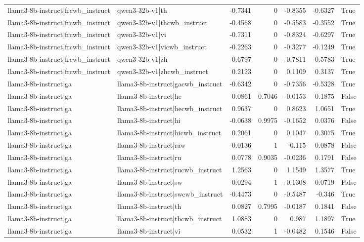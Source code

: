 \begin{table}
\begin{tabular}{l l r r r r l}
llama3-8b-instruct|frcwb_instruct & qwen3-32b-v1|th & -0.7341 & 0 & -0.8355 & -0.6327 & True \\
llama3-8b-instruct|frcwb_instruct & qwen3-32b-v1|thcwb_instruct & -0.4568 & 0 & -0.5583 & -0.3552 & True \\
llama3-8b-instruct|frcwb_instruct & qwen3-32b-v1|vi & -0.7311 & 0 & -0.8324 & -0.6297 & True \\
llama3-8b-instruct|frcwb_instruct & qwen3-32b-v1|vicwb_instruct & -0.2263 & 0 & -0.3277 & -0.1249 & True \\
llama3-8b-instruct|frcwb_instruct & qwen3-32b-v1|zh & -0.6797 & 0 & -0.7811 & -0.5783 & True \\
llama3-8b-instruct|frcwb_instruct & qwen3-32b-v1|zhcwb_instruct & 0.2123 & 0 & 0.1109 & 0.3137 & True \\
llama3-8b-instruct|ga & llama3-8b-instruct|gacwb_instruct & -0.6342 & 0 & -0.7356 & -0.5328 & True \\
llama3-8b-instruct|ga & llama3-8b-instruct|he & 0.0861 & 0.7046 & -0.0153 & 0.1875 & False \\
llama3-8b-instruct|ga & llama3-8b-instruct|hecwb_instruct & 0.9637 & 0 & 0.8623 & 1.0651 & True \\
llama3-8b-instruct|ga & llama3-8b-instruct|hi & -0.0638 & 0.9975 & -0.1652 & 0.0376 & False \\
llama3-8b-instruct|ga & llama3-8b-instruct|hicwb_instruct & 0.2061 & 0 & 0.1047 & 0.3075 & True \\
llama3-8b-instruct|ga & llama3-8b-instruct|raw & -0.0136 & 1 & -0.115 & 0.0878 & False \\
llama3-8b-instruct|ga & llama3-8b-instruct|ru & 0.0778 & 0.9035 & -0.0236 & 0.1791 & False \\
llama3-8b-instruct|ga & llama3-8b-instruct|rucwb_instruct & 1.2563 & 0 & 1.1549 & 1.3577 & True \\
llama3-8b-instruct|ga & llama3-8b-instruct|sw & -0.0294 & 1 & -0.1308 & 0.0719 & False \\
llama3-8b-instruct|ga & llama3-8b-instruct|swcwb_instruct & -0.4473 & 0 & -0.5487 & -0.346 & True \\
llama3-8b-instruct|ga & llama3-8b-instruct|th & 0.0827 & 0.7995 & -0.0187 & 0.1841 & False \\
llama3-8b-instruct|ga & llama3-8b-instruct|thcwb_instruct & 1.0883 & 0 & 0.987 & 1.1897 & True \\
llama3-8b-instruct|ga & llama3-8b-instruct|vi & 0.0532 & 1 & -0.0482 & 0.1546 & False \\

\end{tabular}
\end{table}
